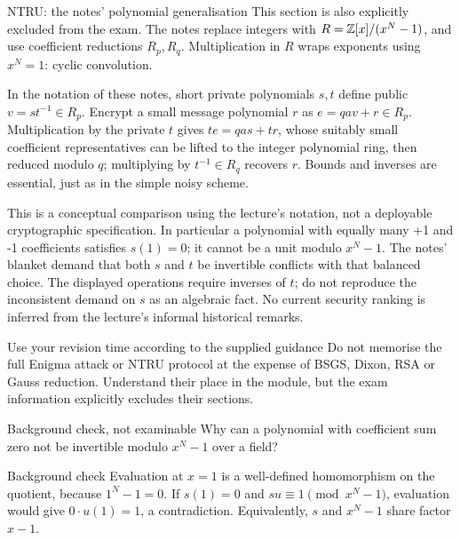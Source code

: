 \documentclass[11pt,a4paper]{article}
\begin{document}
\begin{concept}{NTRU: the notes' polynomial generalisation}
This section is also explicitly excluded from the exam. The notes replace integers with \(R=\mathbb Z[x]/(x^N-1)\), and use coefficient reductions \(R_p,R_q\). Multiplication in \(R\) wraps exponents using \(x^N=1\): cyclic convolution.

In the notation of these notes, short private polynomials \(s,t\) define public \(v=st^{-1}\in R_p\). Encrypt a small message polynomial \(r\) as \(e=qav+r\in R_p\). Multiplication by the private \(t\) gives \(te=qas+tr\), whose suitably small coefficient representatives can be lifted to the integer polynomial ring, then reduced modulo \(q\); multiplying by \(t^{-1}\in R_q\) recovers \(r\). Bounds and inverses are essential, just as in the simple noisy scheme.

This is a conceptual comparison using the lecture's notation, not a deployable cryptographic specification. In particular a polynomial with equally many +1 and -1 coefficients satisfies \(s(1)=0\); it cannot be a unit modulo \(x^N-1\). The notes' blanket demand that both \(s\) and \(t\) be invertible conflicts with that balanced choice. The displayed operations require inverses of \(t\); do not reproduce the inconsistent demand on \(s\) as an algebraic fact. No current security ranking is inferred from the lecture's informal historical remarks.
\end{concept}
\begin{tip}{Use your revision time according to the supplied guidance}
Do not memorise the full Enigma attack or NTRU protocol at the expense of BSGS, Dixon, RSA or Gauss reduction. Understand their place in the module, but the exam information explicitly excludes their sections.
\end{tip}
\begin{question}{Background check, not examinable}
Why can a polynomial with coefficient sum zero not be invertible modulo \(x^N-1\) over a field?
\end{question}
\begin{answer}{Background check}
Evaluation at \(x=1\) is a well-defined homomorphism on the quotient, because \(1^N-1=0\). If \(s(1)=0\) and \(su\equiv1\pmod{x^N-1}\), evaluation would give \(0\cdot u(1)=1\), a contradiction. Equivalently, \(s\) and \(x^N-1\) share factor \(x-1\).
\end{answer}
\end{document}
